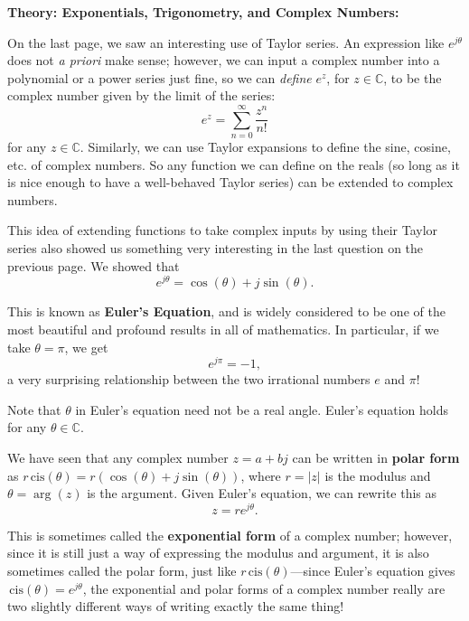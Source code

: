 \documentclass{article}
\newcommand{\cis}{\,\mathrm{cis}}
\begin{document}
\clearpage







\textbf{Theory: Exponentials, Trigonometry, and Complex Numbers:}

\vspace{5mm}


On the last page, we saw an interesting use of Taylor series. An expression like $e^{j\theta}$ does not \textit{a priori} make sense; however, we can input a complex number into a polynomial or a power series just fine, so we can \textit{define} $e^z$, for $z\in\mathbb{C}$, to be the complex number given by the limit of the series:
\[e^z=\sum_{n=0}^\infty \frac{z^n}{n!}\]
for any $z\in \mathbb{C}$. Similarly, we can use Taylor expansions to define the sine, cosine, etc. of complex numbers. So any function we can define on the reals (so long as it is nice enough to have a well-behaved Taylor series) can be extended to complex numbers.

This idea of extending functions to take complex inputs by using their Taylor series also showed us something very interesting in the last question on the previous page. We showed that
\[e^{j\theta}=\cos(\theta)+j\sin(\theta).\]

This is known as \textbf{Euler's Equation}, and is widely considered to be one of the most beautiful and profound results in all of mathematics. In particular, if we take $\theta=\pi$, we get
\[e^{j\pi}=-1,\]
a very surprising relationship between the two irrational numbers $e$ and $\pi$!

Note that $\theta$ in Euler's equation need not be a real angle. Euler's equation holds for any $\theta\in\mathbb{C}$.\bigskip



We have seen that any complex number $z=a+bj$ can be written in \textbf{polar form} as $r\cis(\theta)=r\left(\cos(\theta)+j\sin(\theta)\right)$, where $r=|z|$ is the modulus and $\theta=\arg(z)$ is the argument. Given Euler's equation, we can rewrite this as
\[z=re^{j\theta}.\]

This is sometimes called the \textbf{exponential form} of a complex number; however, since it is still just a way of expressing the modulus and argument, it is also sometimes called the polar form, just like $r\cis(\theta)$---since Euler's equation gives $\cis(\theta)=e^{j\theta}$, the exponential and polar forms of a complex number really are two slightly different ways of writing exactly the same thing!
\end{document}
